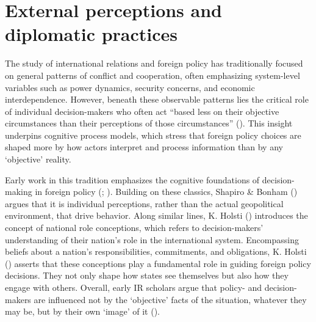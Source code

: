 \documentclass[
  letterpaper,
  DIV=11,
  numbers=noendperiod]{scrartcl}
\begin{document}
\section{External perceptions and diplomatic
practices}\label{external-perceptions-and-diplomatic-practices}

The study of international relations and foreign policy has
traditionally focused on general patterns of conflict and cooperation,
often emphasizing system-level variables such as power dynamics,
security concerns, and economic interdependence. However, beneath these
observable patterns lies the critical role of individual decision-makers
who often act ``based less on their objective circumstances than their
perceptions of those circumstances''
().
This insight underpins cognitive process models, which stress that
foreign policy choices are shaped more by how actors interpret and
process information than by any `objective' reality.

Early work in this tradition emphasizes the cognitive foundations of
decision-making in foreign policy
(;
). Building on these
classics, Shapiro \& Bonham ()
argues that it is individual perceptions, rather than the actual
geopolitical environment, that drive behavior. Along similar lines, K.
Holsti () introduces the concept
of national role conceptions, which refers to decision-makers'
understanding of their nation's role in the international system.
Encompassing beliefs about a nation's responsibilities, commitments, and
obligations, K. Holsti ()
asserts that these conceptions play a fundamental role in guiding
foreign policy decisions. They not only shape how states see themselves
but also how they engage with others. Overall, early IR scholars argue
that policy- and decision-makers are influenced not by the `objective'
facts of the situation, whatever they may be, but by their own `image'
of it ().
\end{document}
